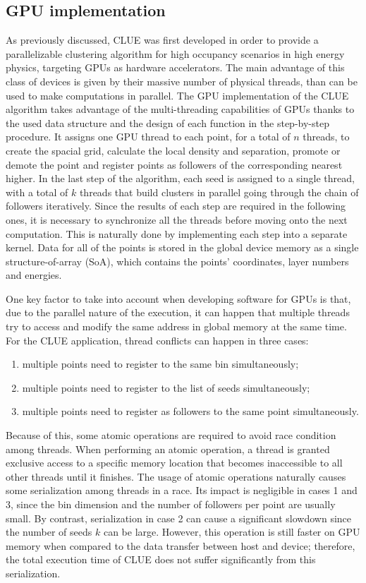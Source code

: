 \subsection{GPU implementation}
\label{ch:gpu_impl}
As previously discussed, CLUE was first developed in order to provide a parallelizable clustering algorithm for high occupancy scenarios in high energy physics, targeting GPUs as hardware accelerators.  The main advantage of this class of devices is given by their massive number of physical threads, than can be used to make computations in parallel. 
The GPU implementation of the CLUE algorithm takes advantage of the multi-threading capabilities of GPUs thanks to the used data structure and the design of each function in the step-by-step procedure. It assigns one GPU thread to each point, for a total of $n$ threads, to create the spacial grid, calculate the local density and separation, promote or demote the point and register points as followers of the corresponding nearest higher. In the last step of the algorithm, each seed is assigned to a single thread, with a total of $k$ threads that build clusters in parallel going through the chain of followers iteratively. Since the results of each step are required in the following ones, it is necessary to synchronize all the threads before moving onto the next computation. This is naturally done by implementing each step into a separate kernel. Data for all of the points is stored in the global device memory as a single structure-of-array (SoA), which contains the points' coordinates, layer numbers and energies.

One key factor to take into account when developing software for GPUs is that, due to the parallel nature of the execution, it can happen that multiple threads try to access and modify the same address in global memory at the same time. For the CLUE application, thread conflicts can happen in three cases:
\begin{enumerate}
    \item multiple points need to register to the same bin simultaneously;
    \item multiple points need to register to the list of seeds simultaneously;
    \item multiple points need to register as followers to the same point simultaneously.
\end{enumerate}
Because of this, some atomic operations are required to avoid race condition among threads. When performing an atomic operation, a thread is granted exclusive access to a specific memory location that becomes inaccessible to all other threads until it finishes. The usage of atomic operations naturally causes some serialization among threads in a race. Its impact is negligible in cases 1 and 3, since the bin dimension and the number of followers per point are usually small. By contrast, serialization in case 2 can cause a significant slowdown since the number of seeds $k$ can be large. However, this operation is still faster on GPU memory when compared to the data transfer between host and device; therefore, the total execution time of CLUE does not suffer significantly from this serialization.


